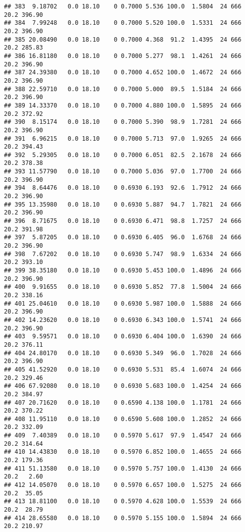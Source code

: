 \documentclass[
]{article}
\begin{document}
\begin{verbatim}
## 383  9.18702   0.0 18.10    0 0.7000 5.536 100.0  1.5804  24 666    20.2 396.90
## 384  7.99248   0.0 18.10    0 0.7000 5.520 100.0  1.5331  24 666    20.2 396.90
## 385 20.08490   0.0 18.10    0 0.7000 4.368  91.2  1.4395  24 666    20.2 285.83
## 386 16.81180   0.0 18.10    0 0.7000 5.277  98.1  1.4261  24 666    20.2 396.90
## 387 24.39380   0.0 18.10    0 0.7000 4.652 100.0  1.4672  24 666    20.2 396.90
## 388 22.59710   0.0 18.10    0 0.7000 5.000  89.5  1.5184  24 666    20.2 396.90
## 389 14.33370   0.0 18.10    0 0.7000 4.880 100.0  1.5895  24 666    20.2 372.92
## 390  8.15174   0.0 18.10    0 0.7000 5.390  98.9  1.7281  24 666    20.2 396.90
## 391  6.96215   0.0 18.10    0 0.7000 5.713  97.0  1.9265  24 666    20.2 394.43
## 392  5.29305   0.0 18.10    0 0.7000 6.051  82.5  2.1678  24 666    20.2 378.38
## 393 11.57790   0.0 18.10    0 0.7000 5.036  97.0  1.7700  24 666    20.2 396.90
## 394  8.64476   0.0 18.10    0 0.6930 6.193  92.6  1.7912  24 666    20.2 396.90
## 395 13.35980   0.0 18.10    0 0.6930 5.887  94.7  1.7821  24 666    20.2 396.90
## 396  8.71675   0.0 18.10    0 0.6930 6.471  98.8  1.7257  24 666    20.2 391.98
## 397  5.87205   0.0 18.10    0 0.6930 6.405  96.0  1.6768  24 666    20.2 396.90
## 398  7.67202   0.0 18.10    0 0.6930 5.747  98.9  1.6334  24 666    20.2 393.10
## 399 38.35180   0.0 18.10    0 0.6930 5.453 100.0  1.4896  24 666    20.2 396.90
## 400  9.91655   0.0 18.10    0 0.6930 5.852  77.8  1.5004  24 666    20.2 338.16
## 401 25.04610   0.0 18.10    0 0.6930 5.987 100.0  1.5888  24 666    20.2 396.90
## 402 14.23620   0.0 18.10    0 0.6930 6.343 100.0  1.5741  24 666    20.2 396.90
## 403  9.59571   0.0 18.10    0 0.6930 6.404 100.0  1.6390  24 666    20.2 376.11
## 404 24.80170   0.0 18.10    0 0.6930 5.349  96.0  1.7028  24 666    20.2 396.90
## 405 41.52920   0.0 18.10    0 0.6930 5.531  85.4  1.6074  24 666    20.2 329.46
## 406 67.92080   0.0 18.10    0 0.6930 5.683 100.0  1.4254  24 666    20.2 384.97
## 407 20.71620   0.0 18.10    0 0.6590 4.138 100.0  1.1781  24 666    20.2 370.22
## 408 11.95110   0.0 18.10    0 0.6590 5.608 100.0  1.2852  24 666    20.2 332.09
## 409  7.40389   0.0 18.10    0 0.5970 5.617  97.9  1.4547  24 666    20.2 314.64
## 410 14.43830   0.0 18.10    0 0.5970 6.852 100.0  1.4655  24 666    20.2 179.36
## 411 51.13580   0.0 18.10    0 0.5970 5.757 100.0  1.4130  24 666    20.2   2.60
## 412 14.05070   0.0 18.10    0 0.5970 6.657 100.0  1.5275  24 666    20.2  35.05
## 413 18.81100   0.0 18.10    0 0.5970 4.628 100.0  1.5539  24 666    20.2  28.79
## 414 28.65580   0.0 18.10    0 0.5970 5.155 100.0  1.5894  24 666    20.2 210.97

\end{verbatim}
\end{document}
